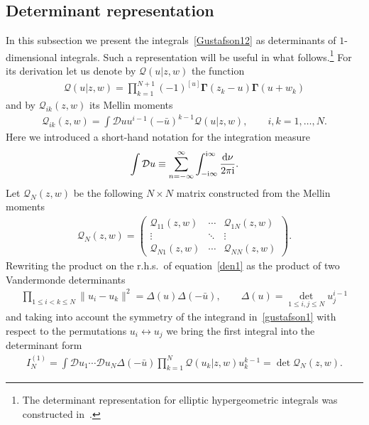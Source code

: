 \documentclass[pdftex]{sigma}
\numberwithin{equation}{section}
\begin{document}
\subsection{Determinant representation}\label{subsec:det}

In this subsection we present the integrals~\eqref{Gustafson12} as determinants of $1$-dimensional integrals. Such a representation will be useful in what follows.\footnote{The determinant representation for elliptic hypergeometric integrals was constructed in~\cite{RainSpiridonov}.} For its derivation let us denote by $\mathcal Q (u|z,w)$ the function
\begin{gather*}%
\mathcal Q (u|z,w)={\prod_{k=1}^{N+1}(-1)^{[u]}\boldsymbol\Gamma(z_k-u)\boldsymbol\Gamma(u+w_k)}
\end{gather*}
and by ${\mathcal{Q}}_{ik}(z,w)$ its Mellin moments
\begin{gather}\label{MellinQ}
{\mathcal{Q}}_{ik}(z,w)=\int \mathcal Du u^{i-1} (-\bar u)^{k-1} \mathcal Q (u|z,w), \qquad i,k=1,\ldots,N.
\end{gather}
Here we introduced a short-hand notation for the integration measure
\begin{gather*}
\int\mathcal Du\equiv
\sum_{n=-\infty}^{\infty}\int_{-{\rm i}\infty}^{{\rm i}\infty}\frac{{\rm d}\nu}{2\pi {\rm i}} .
\end{gather*}
Let $\boldsymbol{\mathcal Q}_N(z,w)$ be the following $N\times N$ matrix constructed from the Mellin moments
 \begin{gather}\label{Q-matrix}
\boldsymbol{\mathcal Q}_N(z,w)=\begin{pmatrix}
{\mathcal{Q}}_{11}(z,w)&\cdots& {\mathcal{Q}}_{1N}(z,w)
\\
\vdots & \ddots &\vdots
\\
{\mathcal{Q}}_{N1}(z,w)&\cdots& {\mathcal{Q}}_{NN}(z,w)
\end{pmatrix}.
\end{gather}
Rewriting the product on the r.h.s.\ of equation~\eqref{den1} as the product of two Vandermonde determinants
\begin{gather*}
\prod_{1\leq i<k\leq N}\|u_i-u_k\|^2=\Delta(u) \Delta (-\bar u), \qquad \Delta(u)=\det_{1\leq i,j\leq N} u_j^{i-1}
\end{gather*}
and taking into account the symmetry of the integrand in~\eqref{gustafson1} with respect to the permutations $u_i\leftrightarrow u_j$ we bring the first integral into the determinant form
\begin{gather}\label{det-rep-1}
I_N^{(1)} =\int\mathcal Du_1\cdots \mathcal Du_N \Delta(-\bar u) \prod_{k=1}^N \mathcal Q (u_k|z,w) u_k^{k-1}=\det \boldsymbol{\mathcal Q}_N(z,w).
\end{gather}
\end{document}
